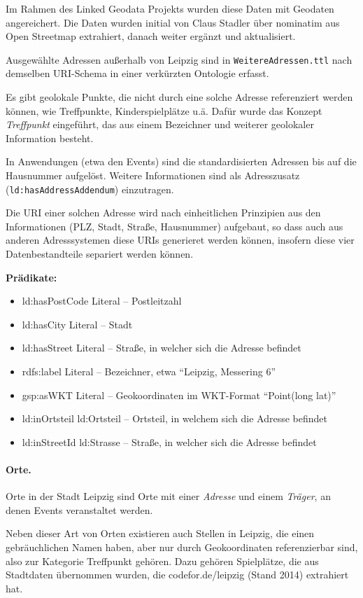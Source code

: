 \documentclass[a4paper,11pt]{article}
\begin{document}
Im Rahmen des Linked Geodata Projekts wurden diese Daten mit Geodaten
angereichert. Die Daten wurden initial von Claus Stadler über nominatim aus
Open Streetmap extrahiert, danach weiter ergänzt und aktualisiert.

Ausgewählte Adressen außerhalb von Leipzig sind in
\texttt{WeitereAdressen.ttl} nach demselben URI-Schema in einer verkürzten
Ontologie erfasst.

Es gibt geolokale Punkte, die nicht durch eine solche Adresse referenziert
werden können, wie Treffpunkte, Kinderspielplätze u.ä. Dafür wurde das Konzept
\emph{Treffpunkt} eingeführt, das aus einem Bezeichner und weiterer geolokaler
Information besteht.

In Anwendungen (etwa den Events) sind die standardisierten Adressen bis auf
die Hausnummer aufgelöst. Weitere Informationen sind als Adresszusatz
(\texttt{ld:hasAddressAddendum}) einzutragen.

Die URI einer solchen Adresse wird nach einheitlichen Prinzipien aus den
Informationen (PLZ, Stadt, Straße, Hausnummer) aufgebaut, so dass auch aus
anderen Adresssystemen diese URIs generieret werden können, insofern diese
vier Datenbestandteile separiert werden können.  

\textbf{Prädikate:}
\begin{itemize}\itemsep0pt
\item ld:hasPostCode Literal – Postleitzahl
 \item ld:hasCity Literal – Stadt
\item ld:hasStreet Literal – Straße, in welcher sich die Adresse befindet
\item rdfs:label Literal – Bezeichner, etwa “Leipzig, Messering 6” 
\item gsp:asWKT Literal – Geokoordinaten im WKT-Format “Point(long lat)”
\item ld:inOrtsteil ld:Ortsteil – Ortsteil, in welchem sich die Adresse
  befindet
\item ld:inStreetId ld:Strasse – Straße, in welcher sich die Adresse befindet
\end{itemize}

\paragraph{Orte.} 
Orte in der Stadt Leipzig sind Orte mit einer \emph{Adresse} und einem
\emph{Träger}, an denen Events veranstaltet werden.

Neben dieser Art von Orten existieren auch Stellen in Leipzig, die einen
gebräuchlichen Namen haben, aber nur durch Geokoordinaten referenzierbar sind,
also zur Kategorie Treffpunkt gehören. Dazu gehören Spielplätze, die aus
Stadtdaten übernommen wurden, die codefor.de/leipzig (Stand 2014) extrahiert
hat.
\end{document}
